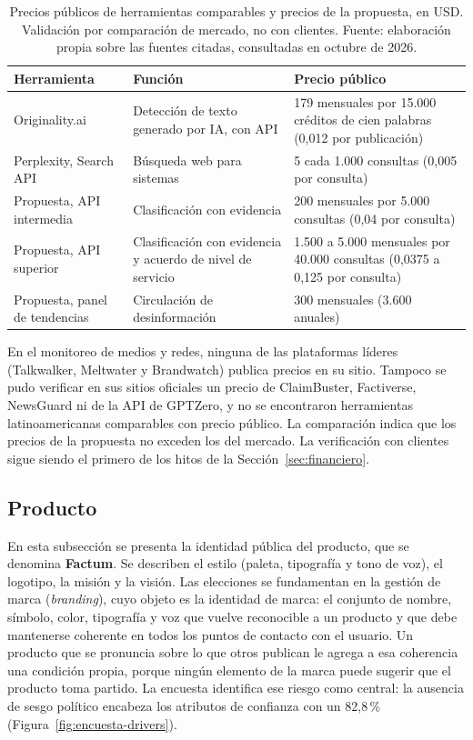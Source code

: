 \begin{table}[t]
  \centering
  \small
  \caption{Precios públicos de herramientas comparables y precios de la propuesta, en USD. Validación por comparación de mercado, no con clientes. Fuente: elaboración propia sobre las fuentes citadas, consultadas en octubre de 2026.}
  \label{tab:referentes-precios}
  \begin{tabular}{p{3.6cm} p{4.4cm} p{5.2cm}}
    \hline
    \textbf{Herramienta} & \textbf{Función} & \textbf{Precio público} \\
    \hline
    Originality.ai \parencite{OriginalityAI2026} & Detección de texto generado por IA, con API & 179 mensuales por 15.000 créditos de cien palabras (0,012 por publicación) \\
    Perplexity, Search API \parencite{Perplexity2026} & Búsqueda web para sistemas & 5 cada 1.000 consultas (0,005 por consulta) \\
    \hline
    Propuesta, API intermedia & Clasificación con evidencia & 200 mensuales por 5.000 consultas (0,04 por consulta) \\
    Propuesta, API superior & Clasificación con evidencia y acuerdo de nivel de servicio & 1.500 a 5.000 mensuales por 40.000 consultas (0,0375 a 0,125 por consulta) \\
    Propuesta, panel de tendencias & Circulación de desinformación & 300 mensuales (3.600 anuales) \\
    \hline
  \end{tabular}
\end{table}

En el monitoreo de medios y redes, ninguna de las plataformas líderes (Talkwalker, Meltwater y Brandwatch) publica precios en su sitio. Tampoco se pudo verificar en sus sitios oficiales un precio de ClaimBuster, Factiverse, NewsGuard ni de la API de GPTZero, y no se encontraron herramientas latinoamericanas comparables con precio público. La comparación indica que los precios de la propuesta no exceden los del mercado. La verificación con clientes sigue siendo el primero de los hitos de la Sección~\ref{sec:financiero}.


\subsection{Producto}
\label{sec:producto}

En esta subsección se presenta la identidad pública del producto, que se denomina \textbf{Factum}. Se describen el estilo (paleta, tipografía y tono de voz), el logotipo, la misión y la visión. Las elecciones se fundamentan en la gestión de marca (\textit{branding}), cuyo objeto es la identidad de marca: el conjunto de nombre, símbolo, color, tipografía y voz que vuelve reconocible a un producto y que debe mantenerse coherente en todos los puntos de contacto con el usuario. Un producto que se pronuncia sobre lo que otros publican le agrega a esa coherencia una condición propia, porque ningún elemento de la marca puede sugerir que el producto toma partido. La encuesta identifica ese riesgo como central: la ausencia de sesgo político encabeza los atributos de confianza con un 82,8\,\% (Figura~\ref{fig:encuesta-drivers}).

